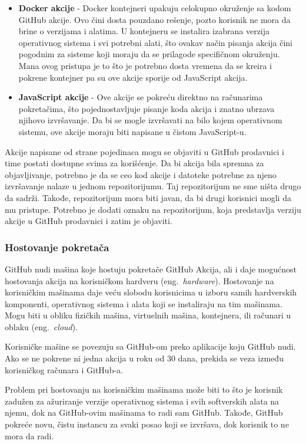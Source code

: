 \documentclass[12pt]{report}
\begin{document}
\begin{itemize}
    \item\textbf{Docker akcije} - Docker kontejneri upakuju celokupno okruženje sa kodom GitHub akcije. Ovo čini dosta pouzdano rešenje, pozto korisnik ne mora da brine o verzijama i alatima. U kontejneru se instalira izabrana verzija operativnog sistema i svi potrebni alati, što ovakav način pisanja akcija čini pogodnim za sisteme koji moraju da se prilagode specifičnom okruženju. Mana ovog pristupa je to što je potrebno dosta vremena da se kreira i pokrene kontejner pa su ove akcije sporije od JavaScript akcija.
    \item\textbf{JavaScript akcije} - Ove akcije se pokreću direktno na računarima pokretačima, što pojednostavljuje pisanje koda akcija i znatno ubrzava njihovo izvršavanje. Da bi se mogle izvršavati na bilo kojem operativnom sistemu, ove akcije moraju biti napisane u čistom JavaScript-u.
\end{itemize}

Akcije napisane od strane pojedinaca mogu se objaviti u GitHub prodavnici i time postati dostupne svima za korišćenje. Da bi akcija bila spremna za objavljivanje, potrebno je da se ceo kod akcije i datoteke potrebne za njeno izvršavanje nalaze u jednom repozitorijumu. Taj repozitorijum ne sme ništa drugo da sadrži. Takođe, repozitorijum mora biti javan, da bi drugi korisnici mogli da mu pristupe. Potrebno je dodati oznaku na repozitorijum, koja predstavlja verziju akcije u GitHub prodavnici i zatim je objaviti.

\subsubsection{Hostovanje pokretača}
GitHub nudi mašina koje hostuju pokretače GitHub Akcija, ali i daje mogućnost hostovanja akcija na korisničkom hardveru (eng.\ \textit{hardware}). Hostovanje na korisničkim mašinama daje veću slobodu korisnicima u izboru samih hardverskih komponenti, operativnog sistema i alata koji se instaliraju na tim mašinama. Mogu biti u obliku fizičkih mašina, virtuelnih mašina, kontejnera, ili računari u oblaku (eng.\ \textit{cloud}).

Korisničke mašine se povezuju sa GitHub-om preko aplikacije koju GitHub nudi. Ako se ne pokrene ni jedna akcija u roku od 30 dana, prekida se veza između korisničkog računara i GitHub-a.

Problem pri hostovanju na korisničkim mašinama može biti to što je korisnik zadužen za ažuriranje verzije operativnog sistema i svih softverskih alata na njemu, dok na GitHub-ovim mašinama to radi sam GitHub. Takođe, GitHub pokreće novu, čistu instancu za svaki posao koji se izvršava, dok korisnik to ne mora da radi.
\end{document}
